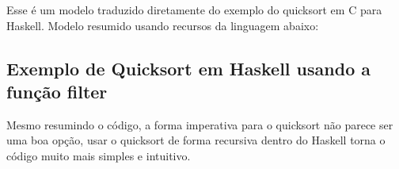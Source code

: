     Esse é um modelo traduzido diretamente do exemplo do quicksort em C para Haskell. Modelo resumido usando recursos da linguagem
    abaixo:

    \subsection{Exemplo de Quicksort em Haskell usando a função filter} 

    Mesmo resumindo o código, a forma imperativa para o quicksort não parece ser uma boa opção, usar o quicksort de forma recursiva
    dentro do Haskell torna o código muito mais simples e intuitivo.

    \nocite{beginnersbook}
    \nocite{qastack}
    \nocite{haskellreport98}
    \nocite{progfuncional}